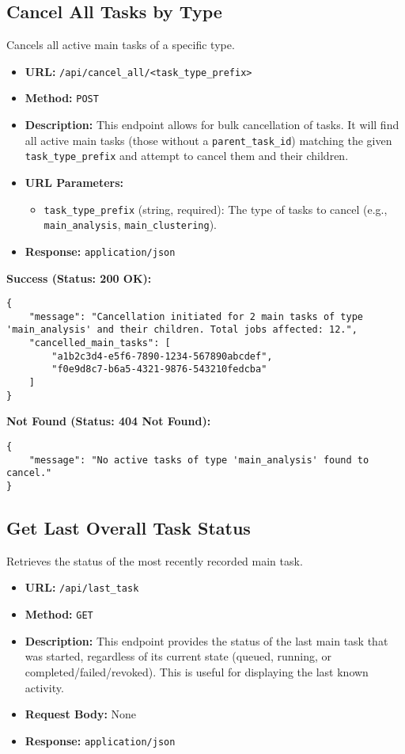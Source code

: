 \documentclass{article}
\begin{document}
\subsection{Cancel All Tasks by Type}
Cancels all active main tasks of a specific type.
\begin{itemize}[noitemsep]
    \item \textbf{URL:} \verb|/api/cancel_all/<task_type_prefix>|
    \item \textbf{Method:} \texttt{POST}
    \item \textbf{Description:} This endpoint allows for bulk cancellation of tasks. It will find all active main tasks (those without a \texttt{parent\_task\_id}) matching the given \texttt{task\_type\_prefix} and attempt to cancel them and their children.
    \item \textbf{URL Parameters:}
    \begin{itemize}[noitemsep]
        \item \texttt{task\_type\_prefix} (string, required): The type of tasks to cancel (e.g., \texttt{main\_analysis}, \texttt{main\_clustering}).
    \end{itemize}
    \item \textbf{Response:} \texttt{application/json}
\end{itemize}

\textbf{Success (Status: 200 OK):}
\lstset{language=json, caption=Example Response: Cancel All Tasks by Type (Success)}
\begin{lstlisting}
{
    "message": "Cancellation initiated for 2 main tasks of type 'main_analysis' and their children. Total jobs affected: 12.",
    "cancelled_main_tasks": [
        "a1b2c3d4-e5f6-7890-1234-567890abcdef",
        "f0e9d8c7-b6a5-4321-9876-543210fedcba"
    ]
}
\end{lstlisting}

\textbf{Not Found (Status: 404 Not Found):}
\lstset{language=json, caption=Example Response: Cancel All Tasks by Type (Not Found)}
\begin{lstlisting}
{
    "message": "No active tasks of type 'main_analysis' found to cancel."
}
\end{lstlisting}

\subsection{Get Last Overall Task Status}
Retrieves the status of the most recently recorded main task.
\begin{itemize}[noitemsep]
    \item \textbf{URL:} \verb|/api/last_task|
    \item \textbf{Method:} \texttt{GET}
    \item \textbf{Description:} This endpoint provides the status of the last main task that was started, regardless of its current state (queued, running, or completed/failed/revoked). This is useful for displaying the last known activity.
    \item \textbf{Request Body:} None
    \item \textbf{Response:} \texttt{application/json}
\end{itemize}
\end{document}
